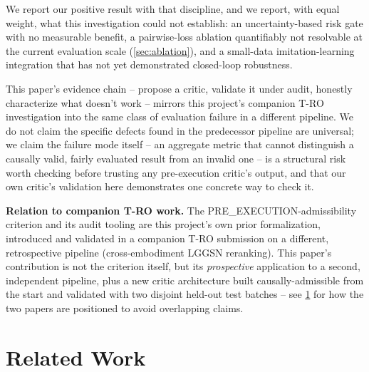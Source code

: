 \documentclass[journal]{IEEEtran}
\begin{document}
We report our positive result with that discipline, and we report, with
equal weight, what this investigation could not establish: an
uncertainty-based risk gate with no measurable benefit, a pairwise-loss
ablation quantifiably not resolvable at the current evaluation scale
(\cref{sec:ablation}), and a small-data imitation-learning integration that
has not yet demonstrated closed-loop robustness.

This paper's evidence chain -- propose a critic, validate it under audit,
honestly characterize what doesn't work -- mirrors this project's companion
T-RO investigation into the same class of evaluation failure in a
different pipeline. We do not claim the specific defects found in the
predecessor pipeline are universal; we claim the failure mode itself -- an
aggregate metric that cannot distinguish a causally valid, fairly evaluated
result from an invalid one -- is a structural risk worth checking before
trusting any pre-execution critic's output, and that our own critic's
validation here demonstrates one concrete way to check it.

\textbf{Relation to companion T-RO work.} The PRE\_EXECUTION-admissibility
criterion and its audit tooling are this project's own prior formalization,
introduced and validated in a companion T-RO submission on a different,
retrospective pipeline (cross-embodiment LGGSN reranking). This paper's
contribution is not the criterion itself, but its \emph{prospective}
application to a second, independent pipeline, plus a new critic
architecture built causally-admissible from the start and validated with
two disjoint held-out test batches -- see \cref{sec:related} for how the
two papers are positioned to avoid overlapping claims.

\section{Related Work}
\label{sec:related}
\end{document}
